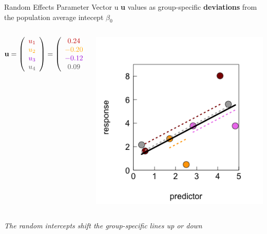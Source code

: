 \documentclass{beamer}
\begin{document}
\begin{frame}{Random Effects Parameter Vector u}
\large \textbf{u} values as group-specific \textbf{deviations} from the population average intecept $\beta_0$
\begin{columns}
        \begin{column}{0.5\textwidth}
\[
\mathbf{u} = \left( 
\begin{array}{c} 
\color{darkred}{u_1} \\ 
\color{orange}{u_2} \\ 
\color{violet}{u_3} \\ 
\color{darkgray}{u_4} 
\end{array}\right) = \left( 
\begin{array}{c} 
\color{darkred}{0.24} \\ 
\color{orange}{-0.20} \\ 
\color{violet}{-0.12} \\ 
\color{darkgray}{0.09} 
\end{array}\right)
\]
        \end{column}
        \begin{column}{0.5\textwidth}
            \includegraphics[width=\textwidth]{lectures/day_5_theory_of_mems/figures/unnamed-chunk-6-1.png}
        \end{column}
    \end{columns}
    \vspace{0.2cm}
\large\textit{The random intercepts shift the group-specific lines up or down}
\end{frame}
\end{document}
